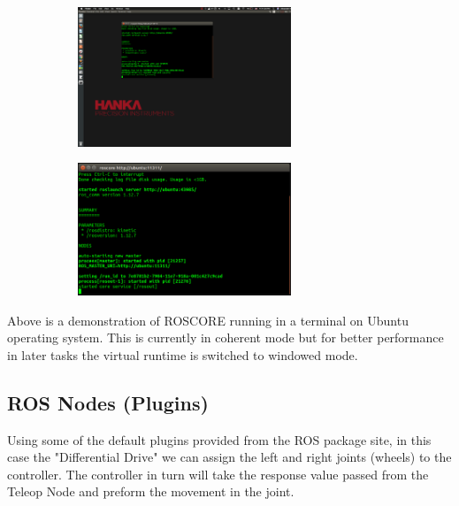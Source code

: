 \documentclass[a4paper, 10pt]{IEEEconf}
\begin{document}
\begin{figure}[H]
\begin{subfigure}{\textwidth}
	\begin{center}
  	\includegraphics[width=0.7\textwidth]{images/ROSCORE}
  	\label{fig:ROSCORE running in terminal Mac Desktop}
  	\end{center}
\end{subfigure}
\begin{subfigure}{\textwidth}
	\begin{center}
  	\includegraphics[width=0.7\textwidth]{images/ROSCORE2}
  	\label{fig:ROSCORE running in terminal enlarged}
  	\end{center}
\end{subfigure}
\end{figure}

Above is a demonstration of ROSCORE running in a terminal on Ubuntu operating system. This is currently in coherent mode but for better performance in later tasks the virtual runtime is switched to windowed mode.

\clearpage
\subsection{ROS Nodes (Plugins)}
Using some of the default plugins provided from the ROS package site, in this case the "Differential Drive" we can assign the left and right joints (wheels) to the controller. The controller in turn will take the response value passed from the Teleop Node and preform the movement in the joint.
\end{document}
